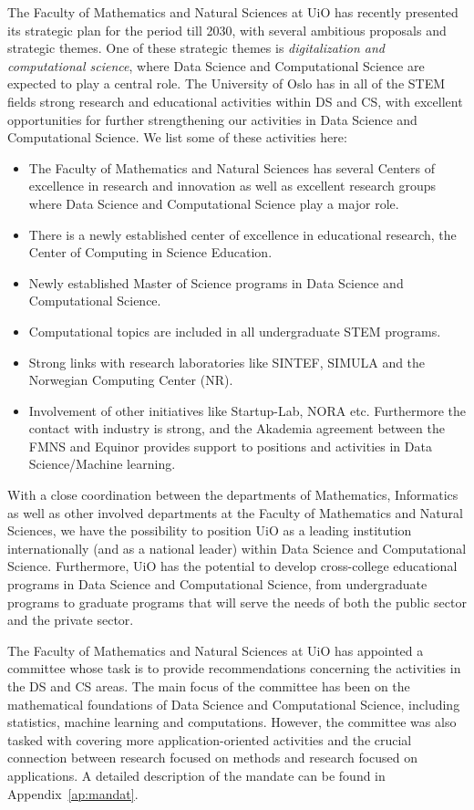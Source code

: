 \documentclass[a4paper,10pt]{article}
\begin{document}
The Faculty of Mathematics and Natural Sciences at UiO has recently presented its strategic plan for the period till 2030, with several ambitious proposals and strategic themes.  One of these strategic themes is \emph{digitalization and computational science}, where Data Science and Computational Science are expected to play a central role. 
The University of Oslo has in all of the STEM fields strong research and educational activities within DS and CS, with excellent opportunities for further strengthening our activities in Data Science and Computational Science. We list some of these activities here:
\begin{itemize}
\item The Faculty of Mathematics and Natural Sciences has several Centers of excellence in research and innovation as well as excellent research groups where Data Science and Computational Science play a major role.
\item There is a  newly established center of excellence in educational research, the Center of Computing in Science Education.
\item Newly established Master of Science programs in Data Science and Computational Science.
\item Computational topics are included in all undergraduate STEM programs.
\item Strong links with research laboratories like SINTEF, SIMULA and the Norwegian Computing Center (NR).
\item Involvement of other initiatives like Startup-Lab, NORA etc. Furthermore the contact with industry is strong, and the Akademia agreement between the FMNS and Equinor provides support to positions and activities in Data Science/Machine learning.
\end{itemize}
With a close coordination between the departments of Mathematics,  Informatics as well as other involved departments at the Faculty of Mathematics and Natural Sciences, we have the possibility to  position UiO as a leading institution internationally (and as a national leader) within Data Science and Computational Science. Furthermore, UiO has the potential to develop cross-college educational programs in Data Science and Computational Science, from undergraduate programs to graduate programs that will serve the needs of both the public sector and the private sector. 

The Faculty of Mathematics and Natural Sciences at UiO has appointed a committee whose task is to provide recommendations concerning the activities in the DS and CS areas. The main focus of the committee has been on the mathematical foundations of Data Science and Computational Science, including statistics, machine learning and computations. However, the committee was also tasked with covering  more application-oriented activities %
and the crucial connection between research focused on methods  and research focused on applications. A detailed description of the mandate can be found in Appendix~\ref{ap:mandat}. 
\end{document}
